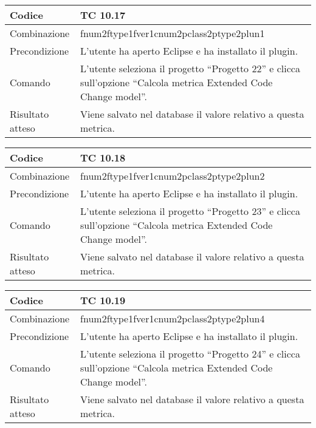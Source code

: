 \begin{table}[ht]
\begin{tabular}{|p{3cm}|p{9cm}|}
\hline
\cellcolor{lightgray}Codice				& TC 10.17								\\
\hline
\cellcolor{lightgray}Combinazione		& fnum2ftype1fver1cnum2pclass2ptype2plun1									\\
\hline
\cellcolor{lightgray}Precondizione		& L'utente ha aperto Eclipse e ha installato il plugin.		\\
\hline
\cellcolor{lightgray}Comando			& L'utente seleziona il progetto ``Progetto 22''  e clicca sull'opzione ``Calcola metrica Extended Code Change model''.	\\
\hline
\cellcolor{lightgray}Risultato atteso	& Viene salvato nel database il valore relativo a questa metrica.\\
\hline
\end{tabular}
\end{table}

\begin{table}[ht]
\begin{tabular}{|p{3cm}|p{9cm}|}
\hline
\cellcolor{lightgray}Codice				& TC 10.18								\\
\hline
\cellcolor{lightgray}Combinazione		& fnum2ftype1fver1cnum2pclass2ptype2plun2									\\
\hline
\cellcolor{lightgray}Precondizione		& L'utente ha aperto Eclipse e ha installato il plugin.		\\
\hline
\cellcolor{lightgray}Comando			& L'utente seleziona il progetto ``Progetto 23''  e clicca sull'opzione ``Calcola metrica Extended Code Change model''.	\\
\hline
\cellcolor{lightgray}Risultato atteso	& Viene salvato nel database il valore relativo a questa metrica.\\
\hline
\end{tabular}
\end{table}

\begin{table}[ht]
\begin{tabular}{|p{3cm}|p{9cm}|}
\hline
\cellcolor{lightgray}Codice				& TC 10.19								\\
\hline
\cellcolor{lightgray}Combinazione		& fnum2ftype1fver1cnum2pclass2ptype2plun4									\\
\hline
\cellcolor{lightgray}Precondizione		& L'utente ha aperto Eclipse e ha installato il plugin.		\\
\hline
\cellcolor{lightgray}Comando			& L'utente seleziona il progetto ``Progetto 24''  e clicca sull'opzione ``Calcola metrica Extended Code Change model''.	\\
\hline
\cellcolor{lightgray}Risultato atteso	& Viene salvato nel database il valore relativo a questa metrica.\\
\hline
\end{tabular}
\end{table}

